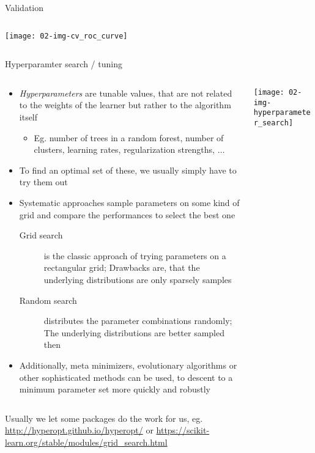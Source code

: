 \begin{frame}{Validation}
\begin{columns}
\begin{column}{0.3\textwidth}
          \vspace{1cm}

          \texttt{[image: 02-img-cv\_roc\_curve]}
        \end{column}
      \end{columns}
    \end{frame}

    \begin{frame}{Hyperparamter search / tuning}
      \enlargethispage{1cm}
      \begin{columns}
        \begin{column}{0.75\textwidth}
          \begin{itemize}
            \item \emph{Hyperparameters} are tunable values, that are not related to the weights of the learner but rather to the algorithm itself
            \begin{itemize}
              \item Eg. number of trees in a random forest, number of clusters, learning rates, regularization strengths, $\dots$
            \end{itemize}
            \item To find an optimal set of these, we usually simply have to try them out
            \item Systematic approaches sample parameters on some kind of grid and compare the performances to select the best one
            \begin{description}
              \item[Grid search] is the classic approach of trying parameters on a rectangular grid; Drawbacks are, that the underlying distributions are only sparsely samples
              \item[Random search] distributes the parameter combinations randomly; The underlying distributions are better sampled then
            \end{description}
            \item Additionally, meta minimizers, evolutionary algorithms or other sophisticated methods can be used, to descent to a minimum parameter set more quickly and robustly
          \end{itemize}
        \end{column}
        \begin{column}{0.25\textwidth}
          \vspace*{1em}

          \texttt{[image: 02-img-hyperparameter\_search]}
        \end{column}
      \end{columns}
      \footnotesize Usually we let some packages do the work for us, eg. \url{http://hyperopt.github.io/hyperopt/} or \url{https://scikit-learn.org/stable/modules/grid_search.html}
    \end{frame}


